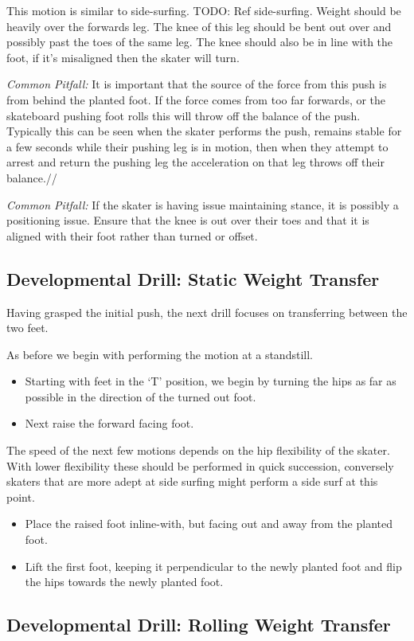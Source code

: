 This motion is similar to side-surfing. {\color{red} TODO: Ref side-surfing}.
Weight should be heavily over the forwards leg. 
The knee of this leg should be bent out over and possibly past the toes of the same leg.
The knee should also be in line with the foot, if it's misaligned then the skater will turn.



{\it Common Pitfall:}
It is important that the source of the force from this push is from behind the planted foot.
If the force comes from too far forwards, or the skateboard pushing foot rolls this will throw off the balance of the push.
Typically this can be seen when the skater performs the push, remains stable for a few seconds while their pushing leg is in motion, then when they attempt to arrest and return the pushing leg the acceleration on that leg throws off their balance.// 


{\it Common Pitfall:}
If the skater is having issue maintaining stance, it is possibly a positioning issue. Ensure that the knee is out over their toes and that it is aligned with their foot rather than turned or offset.   

\subsection*{Developmental Drill: Static Weight Transfer}
\label{drill:lateral/book/weight_transfer_static}

Having grasped the initial push, the next drill focuses on transferring between the two feet.

As before we begin with performing the motion at a standstill. 

\begin{itemize}
\item Starting with feet in the `T' position, we begin by turning the hips as far as possible in the direction of the turned out foot. 
\item Next raise the forward facing foot. 
\end{itemize}
The speed of the next few motions depends on the hip flexibility of the skater. 
With lower flexibility these should be performed in quick succession, conversely skaters that are more adept at side surfing might perform a side surf at this point.    
\begin{itemize}
\item Place the raised foot inline-with, but facing out and away from the planted foot. 
\item Lift the first foot, keeping it perpendicular to the newly planted foot  and flip the hips towards the newly planted foot.
\end{itemize}


\subsection*{Developmental Drill: Rolling Weight Transfer}
\label{drill:lateral/book/weight_transfer_rolling}

